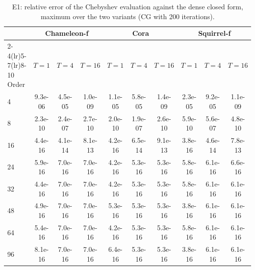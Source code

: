 \begin{table}[h]
\centering
\caption{E1: relative error of the Chebyshev evaluation against the dense closed form, maximum over the two variants (CG with 200 iterations).}
\label{tab:e1cheb}
\footnotesize
\setlength{\tabcolsep}{3pt}
\begin{tabular}{lccccccccc}
\toprule
 & \multicolumn{3}{c}{Chameleon-f} & \multicolumn{3}{c}{Cora} & \multicolumn{3}{c}{Squirrel-f} \\
\cmidrule(lr){2-4}\cmidrule(lr){5-7}\cmidrule(lr){8-10}
Order & $T{=}1$ & $T{=}4$ & $T{=}16$ & $T{=}1$ & $T{=}4$ & $T{=}16$ & $T{=}1$ & $T{=}4$ & $T{=}16$ \\
\midrule
4  & 9.3e-06 & 4.5e-05 & 1.0e-09 & 1.1e-05 & 5.8e-05 & 1.4e-09 & 2.3e-05 & 9.2e-05 & 1.1e-09 \\
8  & 2.3e-10 & 2.4e-07 & 2.7e-10 & 2.0e-10 & 1.9e-07 & 2.6e-10 & 5.9e-10 & 5.6e-07 & 4.8e-10 \\
16 & 4.4e-16 & 4.1e-14 & 8.1e-13 & 4.2e-16 & 6.5e-14 & 9.1e-13 & 3.8e-16 & 4.6e-14 & 7.8e-13 \\
24 & 5.9e-16 & 7.0e-16 & 7.0e-16 & 4.2e-16 & 5.3e-16 & 5.3e-16 & 5.8e-16 & 6.1e-16 & 6.6e-16 \\
32 & 4.4e-16 & 7.0e-16 & 7.0e-16 & 4.2e-16 & 5.3e-16 & 5.3e-16 & 5.8e-16 & 6.1e-16 & 6.1e-16 \\
48 & 4.9e-16 & 7.0e-16 & 7.0e-16 & 5.3e-16 & 5.3e-16 & 5.3e-16 & 3.8e-16 & 6.1e-16 & 6.1e-16 \\
64 & 5.4e-16 & 7.0e-16 & 7.0e-16 & 4.2e-16 & 5.3e-16 & 5.3e-16 & 5.8e-16 & 6.1e-16 & 6.1e-16 \\
96 & 8.1e-16 & 7.0e-16 & 7.0e-16 & 6.4e-16 & 5.3e-16 & 5.3e-16 & 3.8e-16 & 6.1e-16 & 6.1e-16 \\
\bottomrule
\end{tabular}
\end{table}
